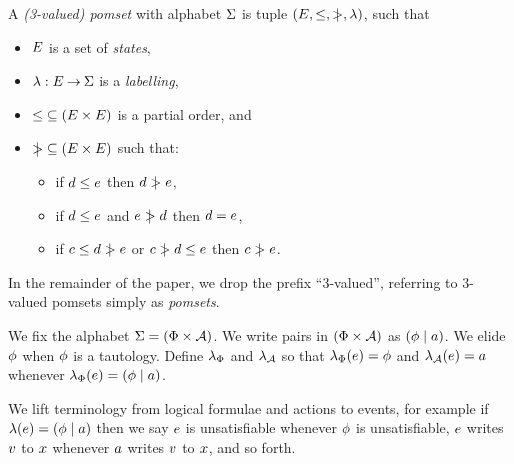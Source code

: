 \begin{definition}
  A \emph{(3-valued) pomset} with alphabet $\Sigma$ is tuple $(E,
  {\le}, {\mathrel{\mkern4mu\mid\!\!\!>}}, \lambda)$, such that 
  \begin{itemize}
  \item $E$ is a set of \emph{states},
  \item $\lambda: E \mathbin\rightarrow \Sigma$ is a \emph{labelling},
  \item ${\le} \subseteq (E\times E)$ is a partial order, and
  \item ${\mathrel{\mkern4mu\mid\!\!\!>}} \subseteq (E\times E)$ such that:
    \begin{itemize}
    \item\label{5a} if $d \le e$ then $d \mathrel{\mkern4mu\mid\!\!\!>} e$,
    \item\label{5b} if $d \le e$ and $e \mathrel{\mkern4mu\mid\!\!\!>} d$ then $d = e$,
    \item if $c \le d \mathrel{\mkern4mu\mid\!\!\!>} e$ or $c \mathrel{\mkern4mu\mid\!\!\!>} d \le e$ then $c \mathrel{\mkern4mu\mid\!\!\!>} e$.
    \end{itemize}
\end{itemize}
\end{definition}
In the remainder of the paper, we drop the prefix ``3-valued'', referring to
3-valued pomsets simply as \emph{pomsets}.

We fix the alphabet $\Sigma=(\Phi\times\mathcal{A})$.  We write pairs in
$(\Phi\times\mathcal{A})$ as $(\phi \mid a)$.  We elide $\phi$ when
$\phi$ is a tautology.  Define $\lambda_{\Phi}$ and $\lambda_{\mathcal{A}}$ so that
$\lambda_{\Phi}(e)=\phi$ and $\lambda_{\mathcal{A}}(e)=a$ whenever
$\lambda_{\Phi}(e)=(\phi\mid a)$.

We lift terminology from logical formulae and actions to events, for example
if $\lambda(e)=(\phi\mid a)$ then we say $e$ is unsatisfiable
whenever $\phi$ is unsatisfiable, $e$ writes $v$ to $x$ whenever
$a$ writes $v$ to $x$, and so forth.

